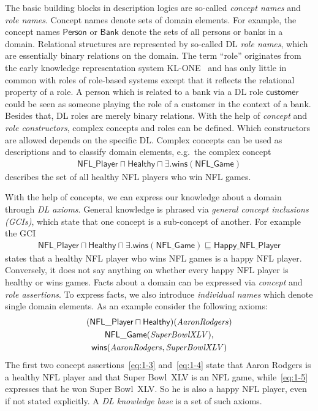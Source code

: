 The basic building blocks in description logics are so-called \emph{concept names} and \emph{role
  names}. Concept names denote sets of domain elements. For example, the concept names
$\mathsf{Person}$ or $\mathsf{Bank}$ denote the sets of all persons or banks in a domain. Relational
structures are represented by so-called DL \emph{role names}, which are essentially binary relations
on the domain. The term ``role'' originates from the early knowledge representation system
KL-ONE~\cite{WoS-CMA133} and has only little in common with roles of role-based systems except that
it reflects the relational property of a role. A person which is related to a bank via a DL role
$\mathsf{customer}$ could be seen as someone playing the role of a customer in the context of a
bank. Besides that, DL roles are merely binary relations. With the help of \emph{concept} and
\emph{role constructors}, complex concepts and roles can be defined.  Which constructors are allowed
depends on the specific DL. Complex concepts can be used as descriptions and to classify domain
elements, e.g.\ the complex concept
\begin{align}
  \label{eq:1-1}
  \mathsf{NFL\_Player} \sqcap \mathsf{Healthy} \sqcap \exists.\mathsf{wins}(\mathsf{NFL\_Game})
\end{align}
describes the set of all healthy NFL players who win NFL games.

With the help of concepts, we can express our knowledge about a domain through \emph{DL
  axioms}. General knowledge is phrased via \emph{general concept inclusions (GCIs)}, which state
that one concept is a sub-concept of another. For example the GCI
\begin{align}
  \label{eq:1-2}
  \mathsf{NFL\_Player} \sqcap \mathsf{Healthy} \sqcap
  \exists.\mathsf{wins}(\mathsf{NFL\_Game}) \sqsubseteq \mathsf{Happy\_NFL\_Player}
\end{align}
states that a healthy NFL player who wins NFL games is a happy NFL player. Conversely, it does not say
anything on whether every happy NFL player is healthy or wins games. Facts about a domain can be
expressed via \emph{concept} and \emph{role assertions}.  To express facts, we also introduce
\emph{individual names} which denote single domain elements. As an example consider the following axioms:
\begin{gather}
  (\mathsf{NFL\_Player} \sqcap \mathsf{Healthy})(\text{\textit{AaronRodgers}})\label{eq:1-3}\\
  \mathsf{NFL\_Game}(\text{\textit{SuperBowlXLV}}),\label{eq:1-4}\\
  \mathsf{\mathsf{wins}}(\text{\textit{AaronRodgers}},\text{\textit{SuperBowlXLV}})\label{eq:1-5}
\end{gather}
The first two concept assertions~\eqref{eq:1-3} and~\eqref{eq:1-4} state that Aaron Rodgers is a healthy NFL player and that Super Bowl~XLV is
an NFL game, while~\eqref{eq:1-5} expresses that he won Super Bowl~XLV. So he is also a happy
NFL player, even if not stated explicitly.  A \emph{DL knowledge base} is a set of such axioms.

